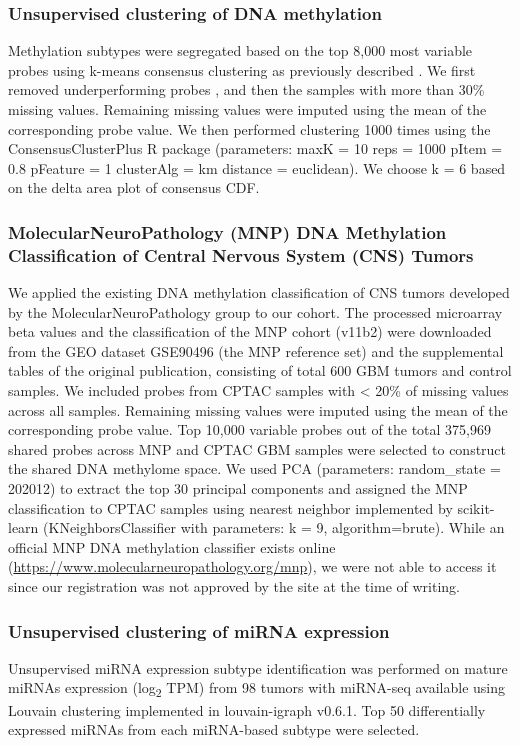 \subsubsection{Unsupervised clustering of DNA methylation}
Methylation subtypes were segregated based on the top 8,000 most variable probes using k-means consensus clustering as previously described \cite{sturmd_pfistersm:HotspotMutations2012}. We first removed underperforming probes \cite{zhouj_bassaj:CDK4MAPK2017}, and then the samples with more than 30\% missing values. Remaining missing values were imputed using the mean of the corresponding probe value. We then performed clustering 1000 times using the ConsensusClusterPlus R package (parameters: maxK = 10 reps = 1000 pItem = 0.8 pFeature = 1 clusterAlg = \textquotedbl{}km\textquotedbl{} distance = \textquotedbl{}euclidean\textquotedbl{}). We choose k = 6 based on the delta area plot of consensus CDF.

\subsubsection{MolecularNeuroPathology (MNP) DNA Methylation Classification of Central Nervous System (CNS) Tumors}
We applied the existing DNA methylation classification of CNS tumors developed by the MolecularNeuroPathology group \cite{capperd_pfistersm:DNAMethylationbased2018} to our cohort. The processed microarray beta values and the classification of the MNP cohort (v11b2) were downloaded from the GEO dataset GSE90496 (the MNP reference set) and the supplemental tables of the original publication, consisting of total 600 GBM tumors and control samples. We included probes from CPTAC samples with < 20\% of missing values across all samples. Remaining missing values were imputed using the mean of the corresponding probe value. Top 10,000 variable probes out of the total 375,969 shared probes across MNP and CPTAC GBM samples were selected to construct the shared DNA methylome space. We used PCA (parameters: random\_state = 202012) to extract the top 30 principal components and assigned the MNP classification to CPTAC samples using nearest neighbor implemented by scikit-learn (KNeighborsClassifier with parameters: k = 9, algorithm=\textquotedbl{}brute\textquotedbl{}). While an official MNP DNA methylation classifier exists online (\url{https://www.molecularneuropathology.org/mnp}), we were not able to access it since our registration was not approved by the site at the time of writing.

\subsubsection{Unsupervised clustering of miRNA expression}
Unsupervised miRNA expression subtype identification was performed on mature miRNAs expression (log\textsubscript{2} TPM) from 98 tumors with miRNA-seq available using Louvain clustering \cite{blondelvd_lefebvree:FastUnfolding2008} implemented in louvain-igraph v0.6.1. Top 50 differentially expressed miRNAs from each miRNA-based subtype were selected.


